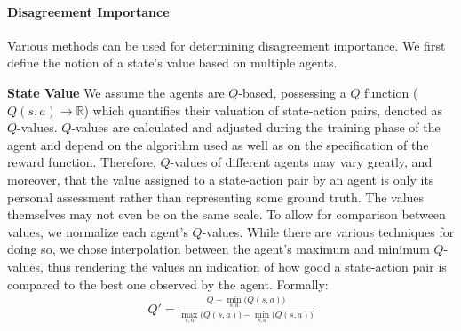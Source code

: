 



\paragraph{Disagreement Importance} 
Various methods can be used for determining disagreement importance. We first define the notion of a state's value based on multiple
agents.

\textbf{State Value}
We assume the agents are $Q$-based, possessing a $Q$ function ($Q(s,a)
\rightarrow \mathbb{R}$) which quantifies
their valuation of state-action pairs, denoted as $Q$-values. $Q$-values are calculated and adjusted during the
training phase of the agent and depend on the algorithm used as well as on the
specification of the reward function. Therefore, $Q$-values of different agents
may vary greatly, and moreover, that the value assigned to a state-action pair by an agent is only its personal assessment rather than representing some ground truth.
The values themselves may not even be on the same scale. To allow for comparison
between values, we normalize each agent's $Q$-values. While there are various techniques for doing so, we chose interpolation between the agent's maximum and minimum $Q$-values, thus rendering the values an indication of how good a state-action pair is compared to the best one observed by the agent. Formally:
\begin{align}
    Q' = \frac{Q-\min_{s,a} \big(Q(s,a) \big)}
    {\max_{s,a} \big (Q(s,a) \big )- \min_{s,a} \big(Q(s,a) \big)}  
\end{align}

